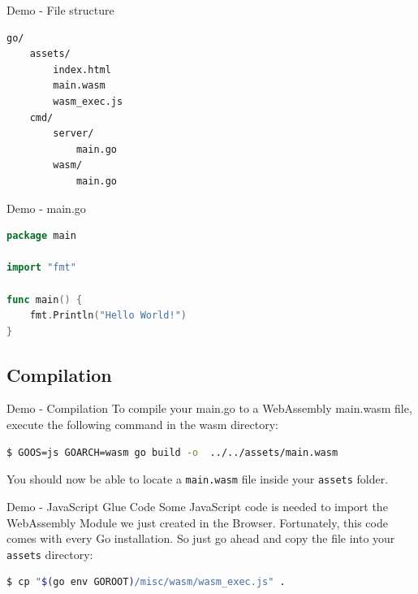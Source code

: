 \documentclass{beamer}
\begin{document}
\begin{frame}[fragile]{Demo - File structure}

    \begin{lstlisting}[language=Bash,basicstyle=\scriptsize]
go/
    assets/
        index.html
        main.wasm
        wasm_exec.js
    cmd/
        server/
            main.go
        wasm/
            main.go
    \end{lstlisting}
\end{frame}

\begin{frame}[fragile]{Demo - main.go}
    \begin{lstlisting}[language=Go,basicstyle=\scriptsize]
package main

import "fmt"

func main() {
	fmt.Println("Hello World!")
}

    \end{lstlisting}
\end{frame}

\subsection{Compilation}

\begin{frame}[fragile]{Demo - Compilation}
    To compile your main.go to a WebAssembly main.wasm file, execute the following command in the wasm directory:

    \begin{lstlisting}[language=Bash,basicstyle=\scriptsize]
$ GOOS=js GOARCH=wasm go build -o  ../../assets/main.wasm
    \end{lstlisting}

    You should now be able to locate a \lstinline{main.wasm} file inside your \lstinline{assets} folder.
\end{frame}

\begin{frame}[fragile]{Demo - JavaScript Glue Code}
    Some JavaScript code is needed to import the WebAssembly Module we just created in the Browser. Fortunately, this code comes with every Go installation. So just go ahead and copy the file into your \lstinline{assets} directory:

    \begin{lstlisting}[language=Bash,basicstyle=\scriptsize]
$ cp "$(go env GOROOT)/misc/wasm/wasm_exec.js" .
\end{lstlisting}
\end{frame}
\end{document}
